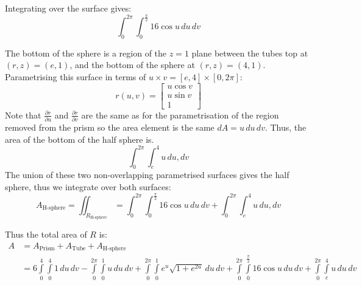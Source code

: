 \documentclass[a4paper, 11pt]{article}
\def\pp#1#2{\frac{\partial #1}{\partial #2}}
\begin{document}
\begin{enumerate}[label=(\alph*)]
\begin{itemize}
\begin{mdframed}

			            Integrating over the surface gives:
			            \[
				            \int_0^{2\pi}\int_0^{\frac{\pi}2} 16\cos u \,du\,dv
			            \]

			            The bottom of the sphere is a region of the $z=1$ plane between the tubes top at $(r,z)=(e,1)$, and the bottom of the sphere at $(r,z)=(4,1)$. Parametrising this surface in terms of $u\times v =[e,4]\times [0,2\pi]$:
			            $$r(u,v)=\begin{bmatrix}
					            u\cos v \\
					            u\sin v \\
					            1
				            \end{bmatrix}$$
			            Note that $\pp ru$ and $\pp rv$ are the same as for the parametrisation of the region removed from the prism so the area element is the same $dA=u\,du\,dv$. Thus, the area of the bottom of the half sphere is.
			            \[
				            \int_0^{2\pi}\int_e^4 u\,du,dv
			            \]
			            The union of these two non-overlapping parametrised surfaces gives the half sphere, thus we integrate over both surfaces:
			            \[
				            A_\text{H-sphere}=\iint_{R_\text{H-sphere}} =  \int_0^{2\pi}\int_0^{\frac{\pi}2} 16\cos u \,du\,dv +\int_0^{2\pi}\int_e^4 u\,du,dv
			            \]
		            \end{mdframed}
	      \end{itemize}
	      Thus the total area of $R$ is:
	      \begin{align*}
		      A & =A_\text{Prism}+A_\text{Tube}+A_\text{H-sphere}                                           \\
		        & = 6\int\limits_0^4\int\limits_0^4 1\,du\,dv-\int\limits_0^{2\pi} \int\limits_0^1u\,du\,dv
		      + \int\limits_0^{2\pi}\int\limits_0^1 e^{u}\sqrt{1+e^{2u}} \,du \, dv
		      + \int\limits_0^{2\pi}\int\limits_0^{\frac{\pi}2} 16\cos u \,du\,dv +\int\limits_0^{2\pi}\int\limits_e^4 u\,du\,dv
	      \end{align*}



\end{enumerate}
\end{document}

